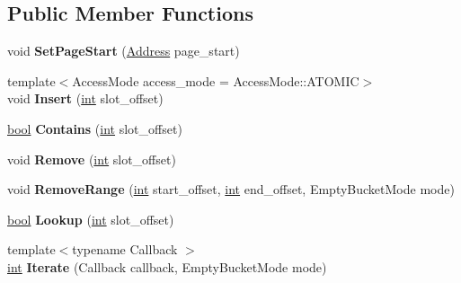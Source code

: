 \subsection*{Public Member Functions}
\begin{DoxyCompactItemize}
\item 
\mbox{\label{classv8_1_1internal_1_1SlotSet_a3991eba2add7cf9153acbe6a5f23a4bb}} 
void {\bfseries Set\+Page\+Start} (\mbox{\hyperlink{classuintptr__t}{Address}} page\+\_\+start)
\item 
\mbox{\label{classv8_1_1internal_1_1SlotSet_a05141866e8b3b7f85c06957c6cdc57cb}} 
{\footnotesize template$<$Access\+Mode access\+\_\+mode = Access\+Mode\+::\+A\+T\+O\+M\+IC$>$ }\\void {\bfseries Insert} (\mbox{\hyperlink{classint}{int}} slot\+\_\+offset)
\item 
\mbox{\label{classv8_1_1internal_1_1SlotSet_a2e460090d4c2ecfab5e42a77df808bab}} 
\mbox{\hyperlink{classbool}{bool}} {\bfseries Contains} (\mbox{\hyperlink{classint}{int}} slot\+\_\+offset)
\item 
\mbox{\label{classv8_1_1internal_1_1SlotSet_a980b7dfc0d0145ff484d72763729a76b}} 
void {\bfseries Remove} (\mbox{\hyperlink{classint}{int}} slot\+\_\+offset)
\item 
\mbox{\label{classv8_1_1internal_1_1SlotSet_a4cf43d1d4089a1df2bf55948ef802eab}} 
void {\bfseries Remove\+Range} (\mbox{\hyperlink{classint}{int}} start\+\_\+offset, \mbox{\hyperlink{classint}{int}} end\+\_\+offset, Empty\+Bucket\+Mode mode)
\item 
\mbox{\label{classv8_1_1internal_1_1SlotSet_a986636bf33efe2283031b903afd04148}} 
\mbox{\hyperlink{classbool}{bool}} {\bfseries Lookup} (\mbox{\hyperlink{classint}{int}} slot\+\_\+offset)
\item 
\mbox{\label{classv8_1_1internal_1_1SlotSet_a1568daca2eea49df733758eb974b525c}} 
{\footnotesize template$<$typename Callback $>$ }\\\mbox{\hyperlink{classint}{int}} {\bfseries Iterate} (Callback callback, Empty\+Bucket\+Mode mode)

\end{DoxyCompactItemize}

